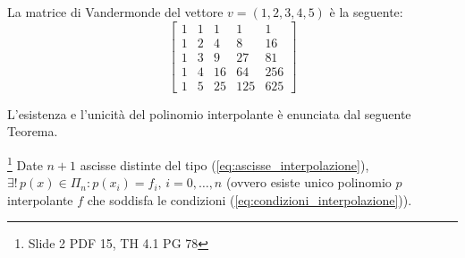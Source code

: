\begin{example}
	La matrice di Vandermonde del vettore $v=(1, 2, 3, 4, 5)$ è la seguente:
	\begin{equation*}
		\begin{bmatrix}
			1    &  1 & 1  &   1  &   1 \\
			1    & 2   &  4  &   8   & 16 \\
			1     & 3   &  9 &   27 &   81\\
			1    & 4   & 16  &  64  &  256 \\
			1     & 5 &   25 &  125 &  625
		\end{bmatrix}
	\end{equation*}
\end{example}

L'esistenza e l'unicità del polinomio interpolante è enunciata dal seguente Teorema.
\begin{theorem}\label{th:esistenza_unicita_polinomio_interpolante}\footnote{Slide 2 PDF 15, TH 4.1 PG 78}
    Date $n+1$ ascisse distinte del tipo (\ref{eq:ascisse_interpolazione}), $\exists!\, p(x)\in\Pi_n: p(x_i)=f_i,\, i=0,\hdots,n$ (ovvero esiste unico polinomio $p$ interpolante $f$ che soddisfa le condizioni (\ref{eq:condizioni_interpolazione})).
\end{theorem}
